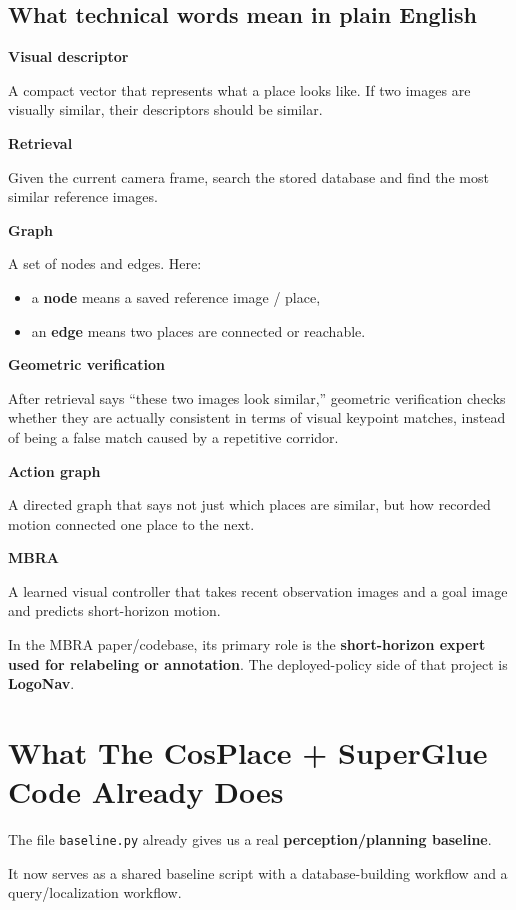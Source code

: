 \documentclass[11pt,a4paper]{article}
\begin{document}
\subsection*{What technical words mean in plain English}

\textbf{Visual descriptor}

A compact vector that represents what a place looks like.
If two images are visually similar, their descriptors should be similar.

\textbf{Retrieval}

Given the current camera frame, search the stored database and find the most
similar reference images.

\textbf{Graph}

A set of nodes and edges.
Here:

\begin{itemize}[nosep]
  \item a \textbf{node} means a saved reference image / place,
  \item an \textbf{edge} means two places are connected or reachable.
\end{itemize}

\textbf{Geometric verification}

After retrieval says ``these two images look similar,'' geometric verification
checks whether they are actually consistent in terms of visual keypoint matches,
instead of being a false match caused by a repetitive corridor.

\textbf{Action graph}

A directed graph that says not just which places are similar, but how recorded
motion connected one place to the next.

\textbf{MBRA}

A learned visual controller that takes recent observation images and a goal image
and predicts short-horizon motion.

In the MBRA paper/codebase, its primary role is the \textbf{short-horizon expert
used for relabeling or annotation}. The deployed-policy side of that project is
\textbf{LogoNav}.


\section{What The CosPlace + SuperGlue Code Already Does}

The file \texttt{baseline.py} already gives us a real
\textbf{perception/planning baseline}.

It now serves as a shared baseline script with a database-building workflow and
a query/localization workflow.
\end{document}
